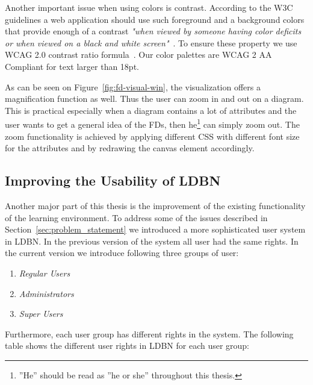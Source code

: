 
Another important issue when using colors is contrast. 
According to the W3C guidelines a web application should use such
foreground and a background colors that provide enough of a
contrast \emph{"when viewed by someone having color deficits or when 
viewed on a black and white screen"}~\cite{w3c1}.
To ensure these property we use WCAG 2.0 contrast ratio formula~\cite{w3c2}.
Our color palettes are WCAG 2 AA Compliant for text larger than 18pt.

As can be seen on Figure~\ref{fig:fd-visual-win}, 
the visualization offers a magnification function as well. 
Thus the user can zoom in and out on a diagram.
This is practical especially when a
diagram contains a lot of attributes and the user 
wants to get a general idea of the FDs, then 
he\footnote{''He'' should be read as ''he or she'' throughout this thesis.} can
simply zoom out. 
The zoom functionality
is achieved by applying different CSS with different font 
size for the attributes and by redrawing the canvas element accordingly. 

\subsection{Improving the Usability of LDBN}
\label{sec:improving}

Another major part of this thesis is the improvement of the
existing functionality of the learning environment. 
To address some of the issues described in 
Section~\ref{sec:problem_statement} we introduced a more sophisticated user system in 
LDBN. In the previous version of the system all user had the same rights. 
In the current version we introduce following three groups of user:
\begin{enumerate}
	\item \emph{Regular Users}
	\item \emph{Administrators}
	\item \emph{Super Users}
\end{enumerate}

Furthermore, each user group has different rights in the system. 
The following table shows the different user rights in LDBN for each user group: 

